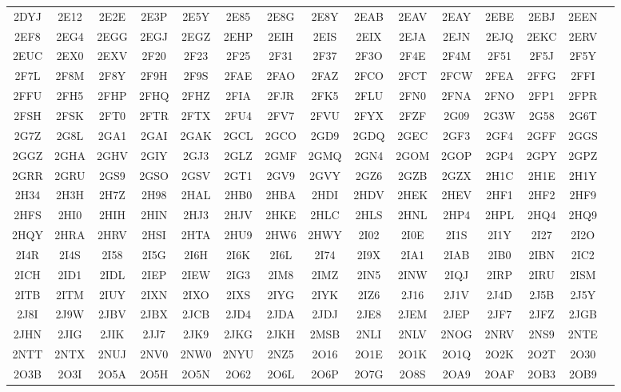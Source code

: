 \begin{longtable}{ c c c c c c c c c c c c c c c }
	2DYJ & 2E12 & 2E2E & 2E3P & 2E5Y & 2E85 & 2E8G & 2E8Y & 2EAB & 2EAV & 2EAY & 2EBE & 2EBJ & 2EEN  \\
	2EF8 & 2EG4 & 2EGG & 2EGJ & 2EGZ & 2EHP & 2EIH & 2EIS & 2EIX & 2EJA & 2EJN & 2EJQ & 2EKC & 2ERV  \\
	2EUC & 2EX0 & 2EXV & 2F20 & 2F23 & 2F25 & 2F31 & 2F37 & 2F3O & 2F4E & 2F4M & 2F51 & 2F5J & 2F5Y  \\
	2F7L & 2F8M & 2F8Y & 2F9H & 2F9S & 2FAE & 2FAO & 2FAZ & 2FCO & 2FCT & 2FCW & 2FEA & 2FFG & 2FFI  \\
	2FFU & 2FH5 & 2FHP & 2FHQ & 2FHZ & 2FIA & 2FJR & 2FK5 & 2FLU & 2FN0 & 2FNA & 2FNO & 2FP1 & 2FPR  \\
	2FSH & 2FSK & 2FT0 & 2FTR & 2FTX & 2FU4 & 2FV7 & 2FVU & 2FYX & 2FZF & 2G09 & 2G3W & 2G58 & 2G6T  \\
	2G7Z & 2G8L & 2GA1 & 2GAI & 2GAK & 2GCL & 2GCO & 2GD9 & 2GDQ & 2GEC & 2GF3 & 2GF4 & 2GFF & 2GGS  \\
	2GGZ & 2GHA & 2GHV & 2GIY & 2GJ3 & 2GLZ & 2GMF & 2GMQ & 2GN4 & 2GOM & 2GOP & 2GP4 & 2GPY & 2GPZ  \\
	2GRR & 2GRU & 2GS9 & 2GSO & 2GSV & 2GT1 & 2GV9 & 2GVY & 2GZ6 & 2GZB & 2GZX & 2H1C & 2H1E & 2H1Y  \\
	2H34 & 2H3H & 2H7Z & 2H98 & 2HAL & 2HB0 & 2HBA & 2HDI & 2HDV & 2HEK & 2HEV & 2HF1 & 2HF2 & 2HF9  \\
	2HFS & 2HI0 & 2HIH & 2HIN & 2HJ3 & 2HJV & 2HKE & 2HLC & 2HLS & 2HNL & 2HP4 & 2HPL & 2HQ4 & 2HQ9  \\
	2HQY & 2HRA & 2HRV & 2HSI & 2HTA & 2HU9 & 2HW6 & 2HWY & 2I02 & 2I0E & 2I1S & 2I1Y & 2I27 & 2I2O  \\
	2I4R & 2I4S & 2I58 & 2I5G & 2I6H & 2I6K & 2I6L & 2I74 & 2I9X & 2IA1 & 2IAB & 2IB0 & 2IBN & 2IC2  \\
	2ICH & 2ID1 & 2IDL & 2IEP & 2IEW & 2IG3 & 2IM8 & 2IMZ & 2IN5 & 2INW & 2IQJ & 2IRP & 2IRU & 2ISM  \\
	2ITB & 2ITM & 2IUY & 2IXN & 2IXO & 2IXS & 2IYG & 2IYK & 2IZ6 & 2J16 & 2J1V & 2J4D & 2J5B & 2J5Y  \\
	2J8I & 2J9W & 2JBV & 2JBX & 2JCB & 2JD4 & 2JDA & 2JDJ & 2JE8 & 2JEM & 2JEP & 2JF7 & 2JFZ & 2JGB  \\
	2JHN & 2JIG & 2JIK & 2JJ7 & 2JK9 & 2JKG & 2JKH & 2MSB & 2NLI & 2NLV & 2NOG & 2NRV & 2NS9 & 2NTE  \\
	2NTT & 2NTX & 2NUJ & 2NV0 & 2NW0 & 2NYU & 2NZ5 & 2O16 & 2O1E & 2O1K & 2O1Q & 2O2K & 2O2T & 2O30  \\
	2O3B & 2O3I & 2O5A & 2O5H & 2O5N & 2O62 & 2O6L & 2O6P & 2O7G & 2O8S & 2OA9 & 2OAF & 2OB3 & 2OB9  \\

\end{longtable}
